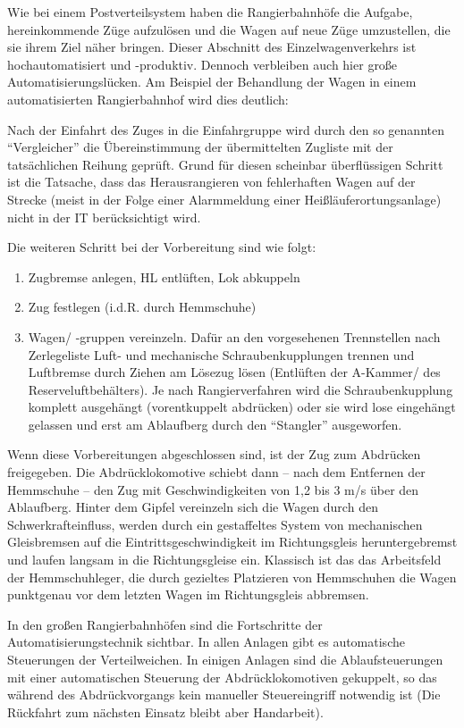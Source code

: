 Wie bei einem Postverteilsystem haben die Rangierbahnhöfe die Aufgabe, hereinkommende Züge aufzulösen und die Wagen auf neue Züge umzustellen, die sie ihrem Ziel näher bringen. Dieser Abschnitt des Einzelwagenverkehrs ist hochautomatisiert und -produktiv. Dennoch verbleiben auch hier große Automatisierungslücken. Am Beispiel der Behandlung der Wagen in einem automatisierten Rangierbahnhof wird dies deutlich:

Nach der Einfahrt des Zuges in die Einfahrgruppe wird durch den so genannten "`Vergleicher"' die Übereinstimmung der übermittelten Zugliste mit der tatsächlichen Reihung geprüft. Grund für diesen scheinbar überflüssigen Schritt ist die Tatsache, dass das Herausrangieren von fehlerhaften Wagen auf der Strecke (meist in der Folge einer Alarmmeldung einer Heißläuferortungsanlage) nicht in der IT berücksichtigt wird.

Die weiteren Schritt bei der Vorbereitung sind wie folgt:
\begin{enumerate}
    \item Zugbremse anlegen, HL entlüften, Lok abkuppeln
    \item Zug festlegen (i.d.R. durch Hemmschuhe)
    \item Wagen/ -gruppen vereinzeln. Dafür an den vorgesehenen Trennstellen nach Zerlegeliste Luft- und mechanische Schraubenkupplungen trennen und Luftbremse durch Ziehen am Lösezug lösen (Entlüften der A-Kammer/ des Reserveluftbehälters). Je nach Rangierverfahren wird die Schraubenkupplung komplett ausgehängt (vorentkuppelt abdrücken) oder sie wird lose eingehängt gelassen und erst am Ablaufberg durch den "`Stangler"' ausgeworfen.
\end{enumerate}

Wenn diese Vorbereitungen abgeschlossen sind, ist der Zug zum Abdrücken freigegeben. Die Abdrücklokomotive schiebt dann -- nach dem Entfernen der Hemmschuhe -- den Zug mit Geschwindigkeiten von 1,2 bis 3 m/s über den Ablaufberg. Hinter dem Gipfel vereinzeln sich die Wagen durch den Schwerkrafteinfluss, werden durch ein gestaffeltes System von mechanischen Gleisbremsen auf die Eintrittsgeschwindigkeit im Richtungsgleis heruntergebremst und laufen langsam in die Richtungsgleise ein.  Klassisch ist das das Arbeitsfeld der Hemmschuhleger, die durch gezieltes Platzieren von Hemmschuhen die Wagen punktgenau vor dem letzten Wagen im Richtungsgleis abbremsen.

In den großen Rangierbahnhöfen sind die Fortschritte der Automatisierungstechnik sichtbar. In allen Anlagen gibt es automatische Steuerungen der Verteilweichen. In einigen Anlagen sind die Ablaufsteuerungen mit einer automatischen Steuerung der Abdrücklokomotiven gekuppelt, so das während des Abdrückvorgangs kein manueller Steuereingriff notwendig ist (Die Rückfahrt zum nächsten Einsatz bleibt aber Handarbeit).

